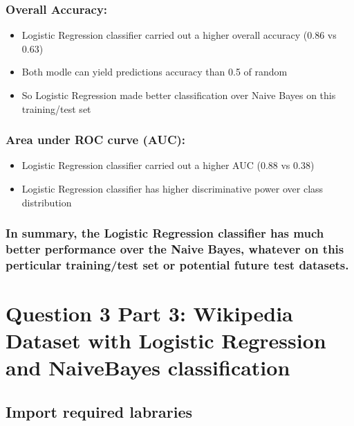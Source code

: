 \documentclass{report}
\providecommand{\tightlist}{%
      \setlength{\itemsep}{0pt}\setlength{\parskip}{0pt}}
\begin{document}
\subsection{Overall Accuracy:}\label{overall-accuracy}

\begin{itemize}
\tightlist
\item
  Logistic Regression classifier carried out a higher overall accuracy
  (0.86 vs 0.63)
\item
  Both modle can yield predictions accuracy than 0.5 of random
\item
  So Logistic Regression made better classification over Naive Bayes on
  this training/test set
\end{itemize}

\subsection{Area under ROC curve (AUC):}\label{area-under-roc-curve-auc}

\begin{itemize}
\tightlist
\item
  Logistic Regression classifier carried out a higher AUC (0.88 vs 0.38)
\item
  Logistic Regression classifier has higher discriminative power over
  class distribution
\end{itemize}

\subsection{In summary, the Logistic Regression classifier has much
better performance over the Naive Bayes, whatever on this perticular
training/test set or potential future test
datasets.}\label{in-summary-the-logistic-regression-classifier-has-much-better-performance-over-the-naive-bayes-whatever-on-this-perticular-trainingtest-set-or-potential-future-test-datasets.}

\chapter{Question 3 Part 3: Wikipedia Dataset with Logistic Regression
and NaiveBayes
classification}\label{question-3-part-3-wikipedia-dataset-with-logistic-regression-and-naivebayes-classification}

\section{Import required labraries}\label{import-required-labraries}
\end{document}
